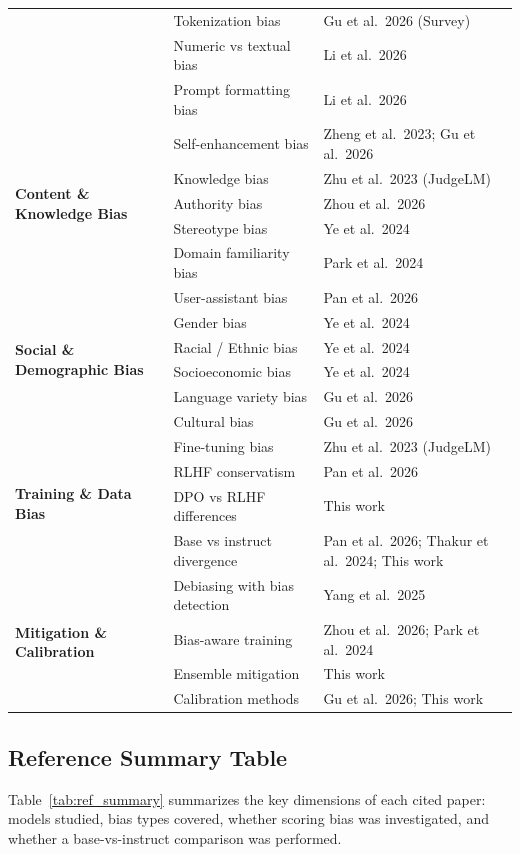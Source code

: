 \begin{table}[h]
\begin{tabular}{lll}
& Tokenization bias & Gu et al.~2026 (Survey) \\
& Numeric vs textual bias & Li et al.~2026 \\
& Prompt formatting bias & Li et al.~2026 \\
\midrule
\multirow{5}{*}{\textbf{Content \& Knowledge Bias}}
& Self-enhancement bias & Zheng et al.~2023; Gu et al.~2026 \\
& Knowledge bias & Zhu et al.~2023 (JudgeLM) \\
& Authority bias & Zhou et al.~2026 \\
& Stereotype bias & Ye et al.~2024 \\
& Domain familiarity bias & Park et al.~2024 \\
\midrule
\multirow{6}{*}{\textbf{Social \& Demographic Bias}}
& User-assistant bias & Pan et al.~2026 \\
& Gender bias & Ye et al.~2024 \\
& Racial / Ethnic bias & Ye et al.~2024 \\
& Socioeconomic bias & Ye et al.~2024 \\
& Language variety bias & Gu et al.~2026 \\
& Cultural bias & Gu et al.~2026 \\
\midrule
\multirow{4}{*}{\textbf{Training \& Data Bias}}
& Fine-tuning bias & Zhu et al.~2023 (JudgeLM) \\
& RLHF conservatism & Pan et al.~2026 \\
& DPO vs RLHF differences & This work \\
& Base vs instruct divergence & Pan et al.~2026; Thakur et al.~2024; This work \\
\midrule
\multirow{4}{*}{\textbf{Mitigation \& Calibration}}
& Debiasing with bias detection & Yang et al.~2025 \\
& Bias-aware training & Zhou et al.~2026; Park et al.~2024 \\
& Ensemble mitigation & This work \\
& Calibration methods & Gu et al.~2026; This work \\
\bottomrule
\end{tabular}
\end{table}

\subsection{Reference Summary Table}

Table~\ref{tab:ref_summary} summarizes the key dimensions of each cited paper: models studied, bias types covered, whether scoring bias was investigated, and whether a base-vs-instruct comparison was performed.


